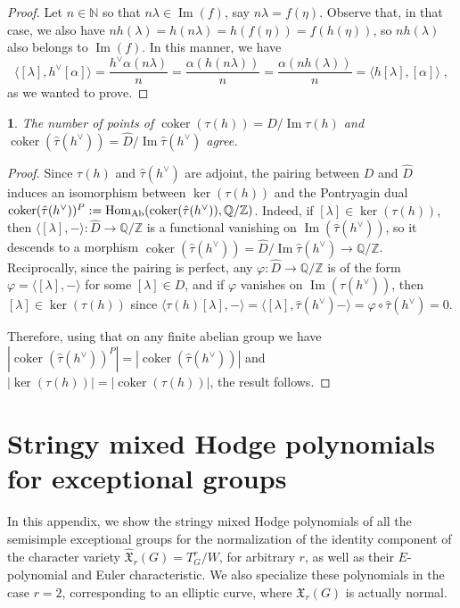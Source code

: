 \documentclass[11pt,english]{amsart}
\numberwithin{equation}{section}
\numberwithin{figure}{section}
\theoremstyle{plain}
\newtheorem{cor}[thm]{\protect\corollaryname}
\theoremstyle{plain}
\theoremstyle{definition}
\theoremstyle{remark}
\DeclareMathOperator{\image}{Im}
\newcommand{\ZZ}{\mathbb{Z}}
\newcommand{\NN}{\mathbb{N}}
\newcommand{\QQ}{\mathbb{Q}}
\newcommand{\coker}{\operatorname{coker}}
\newcommand{\Hom}{\operatorname{Hom}}
\newcommand{\Ab}{\textup{Ab}}
\providecommand{\corollaryname}{Corollary}
\begin{document}
\begin{proof}
Let $n \in \NN$ so that $n\lambda \in \image(f)$, say $n\lambda = f(\eta)$. Observe that, in that case, we also have $nh(\lambda) = h(n\lambda) = h(f(\eta)) = f(h(\eta))$, so $nh(\lambda)$ also belongs to $\image(f)$. In this manner, we have
$$
\langle [\lambda], h^\vee[\alpha]\rangle = \frac{h^\vee\alpha(n\lambda)}{n} = \frac{\alpha(h(n\lambda))}{n} = \frac{\alpha(nh(\lambda))}{n} = \langle h[\lambda], [\alpha]\rangle\; ,
$$
as we wanted to prove.
\end{proof}

\begin{cor}\label{cor:number-points}
    The number of points of $\coker(\tau(h)) = D/\image \tau(h)$ and $\coker(\hat{\tau}(h^\vee)) = \hat{D}/\image \hat{\tau}(h^\vee)$ agree.
\end{cor}

\begin{proof}
    Since $\tau(h)$ and $\hat{\tau}(h^\vee)$ are adjoint, the pairing between $D$ and $\hat{D}$ induces an isomorphism between $\ker(\tau(h))$ and the Pontryagin dual $ \coker(\hat{\tau}(h^\vee))^P := \Hom_{\Ab}(\coker(\hat{\tau}(h^\vee)), \QQ/\ZZ)$. Indeed, if $[\lambda] \in \ker(\tau(h))$, then $\langle [\lambda], -\rangle: \hat{D} \to \QQ/\ZZ$ is a functional vanishing on $\image(\hat{\tau}(h^\vee))$, so it descends to a morphism $\coker(\hat{\tau}(h^\vee))=\hat{D}/\image{\hat{\tau}(h^\vee)} \to \QQ/\ZZ$. Reciprocally, since the pairing is perfect, any $\varphi:  \hat{D} \to \QQ/\ZZ$ is of the form $\varphi = \langle [\lambda], -\rangle$ for some $[\lambda] \in D$, and if $\varphi$ vanishes on $\image(\hat{\tau}(h^\vee))$, then $[\lambda] \in \ker(\tau(h))$ since $\langle \tau(h)[\lambda], -\rangle = \langle [\lambda], \hat{\tau}(h^\vee)-\rangle = \varphi \circ \hat{\tau}(h^\vee) = 0$.

    Therefore, using that on any finite abelian group we have $|\coker(\hat{\tau}(h^\vee))^P|=|\coker(\hat{\tau}(h^\vee))|$ and $|\ker(\tau(h))| = |\coker(\tau(h))|$, the result follows.
\end{proof}


\section{Stringy mixed Hodge polynomials for exceptional groups}\label{app:calculations}

In this appendix, we show the stringy mixed Hodge polynomials of all the semisimple exceptional groups for the normalization of the identity component of the character variety $\hat{\mathfrak{X}}_{r}(G) = T_{G}^r/W$, for arbitrary $r$, as well as their $E$-polynomial and Euler characteristic. We also specialize these polynomials in the case $r = 2$, corresponding to an elliptic curve, where $\mathfrak{X}_{r}(G)$ is actually normal.
\end{document}
